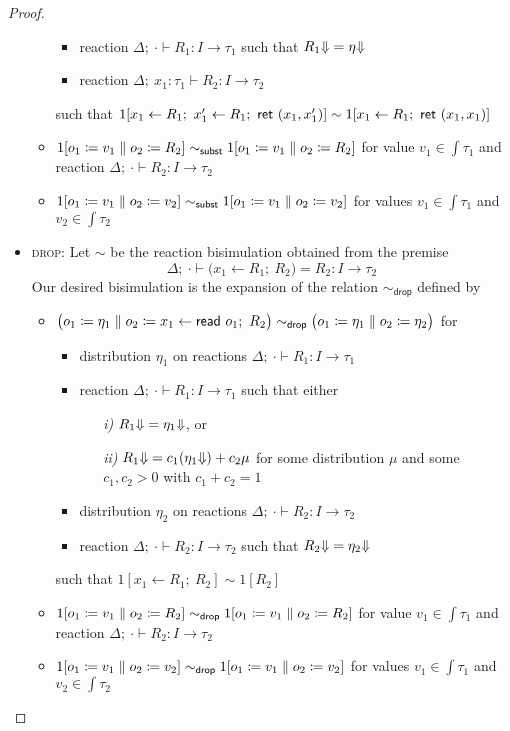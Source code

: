 \begin{proof}
\begin{itemize}
\begin{itemize}
\begin{itemize}
\item reaction $\Delta; \ \cdot \vdash R_1 : I \to \tau_1$ such that ${R_1 \hspace{-2.5pt} \Downarrow} = {\eta \hspace{-2.5pt} \Downarrow}$
\item reaction $\Delta; \ x_1 : \tau_1 \vdash R_2 : I \to \tau_2$
\end{itemize}
such that $1[x_1 \leftarrow R_1; \ x_1' \leftarrow R_1; \ \ret{(x_1,x_1')}] \sim 1[x_1 \leftarrow R_1; \ \ret{(x_1,x_1)}]$
\item $1[o_1 \coloneqq v_1 \; \| \; o_2 \coloneqq R_2] \sim_\mathsf{subst} 1[o_1 \coloneqq v_1 \; \| \; o_2 \coloneqq R_2]$ for value $v_1 \in \int{\tau_1}$ and reaction $\Delta; \ \cdot \vdash R_2 : I \to \tau_2$
\item $1[o_1 \coloneqq v_1 \; \| \; o_2 \coloneqq v_2] \sim_\mathsf{subst} 1[o_1 \coloneqq v_1 \; \| \; o_2 \coloneqq v_2]$ for values $v_1 \in \int{\tau_1}$ and $v_2 \in \int{\tau_2}$
\end{itemize}
\item \textsc{drop}: Let $\sim$ be the reaction bisimulation obtained from the premise
\[\Delta; \ \cdot \vdash \big(x_1 \leftarrow R_1; \ R_2\big) = R_2 : I \to \tau_2\]
Our desired bisimulation is the expansion of the relation $\sim_{\mathsf{drop}}$ defined by
\begin{itemize}
\item $\big(o_1 \coloneqq \eta_1 \; \| \; o_2 \coloneqq x_1 \leftarrow \mathsf{read} \ o_1; \ R_2\big) \sim_{\mathsf{drop}} \big(o_1 \coloneqq \eta_1 \; \| \; o_2 \coloneqq \eta_2\big)$ for
\begin{itemize}
\item distribution $\eta_1$ on reactions $\Delta; \ \cdot \vdash R_1 : I \to \tau_1$
\item reaction $\Delta; \ \cdot \vdash R_1 : I \to \tau_1$ such that either
\begin{itemize}
\item[\emph{i)}] ${R_1 \hspace{-2.5pt} \Downarrow} = {\eta_1 \hspace{-2.5pt} \Downarrow}$, or
\item[\emph{ii)}] ${R_1 \hspace{-2.5pt} \Downarrow} = c_1 ({\eta_1 \hspace{-2.5pt} \Downarrow}) + c_2 \mu$ for some distribution $\mu$ and some $c_1,c_2 > 0$ with $c_1 + c_2 = 1$
\end{itemize}
\item distribution $\eta_2$ on reactions $\Delta; \ \cdot \vdash R_2 : I \to \tau_2$
\item reaction $\Delta; \ \cdot \vdash R_2 : I \to \tau_2$ such that ${R_2 \hspace{-2.5pt} \Downarrow} = {\eta_2 \hspace{-2.5pt} \Downarrow}$
\end{itemize}
such that $1[x_1 \leftarrow R_1; \ R_2] \sim 1[R_2]$
\item $1[o_1 \coloneqq v_1 \; \| \; o_2 \coloneqq R_2] \sim_{\mathsf{drop}} 1[o_1 \coloneqq v_1 \; \| \; o_2 \coloneqq R_2]$ for value $v_1 \in \int{\tau_1}$ and reaction $\Delta; \ \cdot \vdash R_2 : I \to \tau_2$
\item $1[o_1 \coloneqq v_1 \; \| \; o_2 \coloneqq v_2] \sim_{\mathsf{drop}} 1[o_1 \coloneqq v_1 \; \| \; o_2 \coloneqq v_2]$ for values $v_1 \in \int{\tau_1}$ and $v_2 \in \int{\tau_2}$
\end{itemize}
\end{itemize}
\end{proof}


